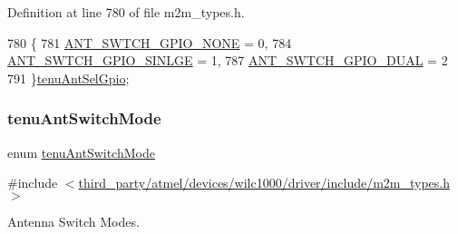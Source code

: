 Definition at line 780 of file m2m\+\_\+types.\+h.


\begin{DoxyCode}
780              \{
781     \hyperlink{group__WlanEnums_gga79d8d22335f19b2d3a8cc95b915792ceabcded9a7d5db6443c6184c9a92653994}{ANT\_SWTCH\_GPIO\_NONE}      = 0,
784     \hyperlink{group__WlanEnums_gga79d8d22335f19b2d3a8cc95b915792ceae0f68f2bcf97ae62137828b84ffb6980}{ANT\_SWTCH\_GPIO\_SINLGE}  = 1,
787     \hyperlink{group__WlanEnums_gga79d8d22335f19b2d3a8cc95b915792ceae18544df36cb77b84241a02a906c65b4}{ANT\_SWTCH\_GPIO\_DUAL}     = 2
791 \}\hyperlink{group__WlanEnums_ga79d8d22335f19b2d3a8cc95b915792ce}{tenuAntSelGpio};
\end{DoxyCode}
\mbox{\label{group__WlanEnums_ga2060d527c27ea7770fea3cd48c55dac6}} 
\subsubsection{\texorpdfstring{tenu\+Ant\+Switch\+Mode}{tenuAntSwitchMode}}
{\footnotesize\ttfamily enum \hyperlink{group__WlanEnums_ga2060d527c27ea7770fea3cd48c55dac6}{tenu\+Ant\+Switch\+Mode}}



{\ttfamily \#include $<$\hyperlink{m2m__types_8h}{third\+\_\+party/atmel/devices/wilc1000/driver/include/m2m\+\_\+types.\+h}$>$}



Antenna Switch Modes. 

